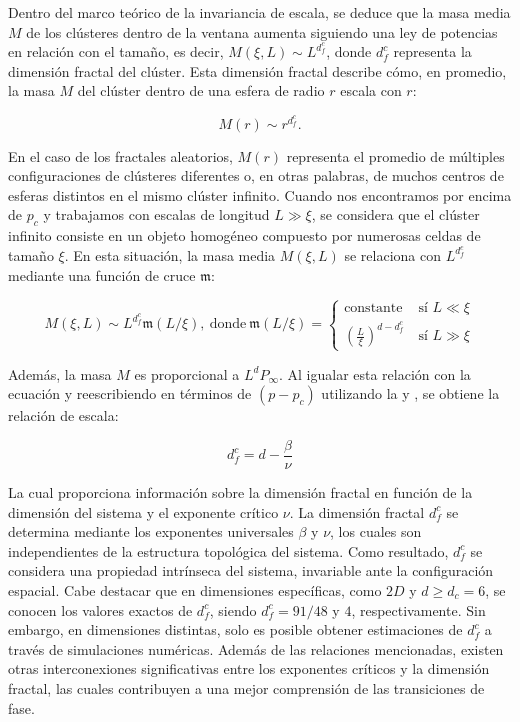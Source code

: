 Dentro del marco teórico de la invariancia de escala, se deduce que la masa media $M$ de los clústeres dentro de la ventana aumenta siguiendo una ley de potencias en relación con el tamaño, es decir, $M(\xi,L)\sim L^{d_f^c}$, donde $d_f^c$ representa la dimensión fractal del clúster. Esta dimensión fractal describe cómo, en promedio, la masa $M$ del clúster dentro de una esfera de radio $r $ escala con $r$:

\begin{equation}
	M(r)\sim r^{d_f^c}.
\end{equation}

En el caso de los fractales aleatorios, $M(r)$ representa el promedio de múltiples configuraciones de clústeres diferentes o, en otras palabras, de muchos centros de esferas distintos en el mismo clúster infinito. Cuando nos encontramos por encima de $p_c$ y trabajamos con escalas de longitud $L\gg\xi$, se considera que el clúster infinito consiste en un objeto homogéneo compuesto por numerosas celdas de tamaño $\xi$. En esta situación, la masa media $M(\xi,L)$ se relaciona con $L^{d_f^c}$ mediante una función de cruce $\mathfrak{m}$:

\begin{equation}\label{eq:23}
M(\xi,L) \sim L^{d_f^c} \mathfrak{m}(L/\xi), \ \text{donde} \  \mathfrak{m}(L/\xi)= \begin{cases}
	\text{constante }& \text{sí } L\ll\xi\\
	\left(\frac{L}{\xi}\right)^{d-d_f^c} & \text{sí } L\gg\xi
\end{cases}
\end{equation}

Además, la masa $M$ es proporcional a $L^dP_\infty$.   Al igualar esta relación con la ecuación  y reescribiendo en términos de $(p - p_c)$ utilizando  la  y , se obtiene la relación de escala:

\begin{equation}\label{eq:24}
d_f^c=d-\frac{\beta}{\nu}
\end{equation}

 La cual proporciona información sobre la dimensión fractal en función de la dimensión del sistema y el exponente crítico $\nu$.  La dimensión fractal $d_f^c$ se determina mediante los exponentes universales $\beta$ y $\nu$, los cuales son independientes de la estructura topológica del sistema. Como resultado, $d_f^c$ se considera una propiedad intrínseca del sistema, invariable ante la configuración espacial.  Cabe destacar que en dimensiones específicas, como $2D$ y $d \geq d_c = 6$, se conocen los valores exactos de $d_f^c$, siendo $d_f^c = 91/48$ y $4$, respectivamente. Sin embargo, en dimensiones distintas, solo es posible obtener estimaciones de $d_f^c$ a través de simulaciones numéricas. Además de las relaciones mencionadas, existen otras interconexiones significativas entre los exponentes críticos y la dimensión fractal, las cuales contribuyen a una mejor comprensión de las transiciones de fase. 

